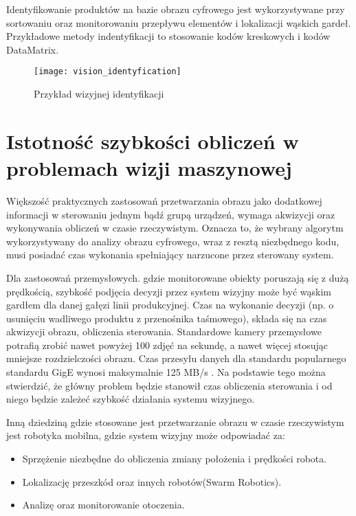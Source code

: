 \documentclass[document.tex]{subfiles}
\begin{document}
	\indent Identyfikowanie produktów na bazie obrazu cyfrowego jest wykorzystywane przy sortowaniu
	oraz monitorowaniu przepływu elementów i lokalizacji wąskich gardeł.
	Przykładowe metody indentyfikacji to stosowanie kodów kreskowych i kodów DataMatrix.\cite{Machine_Vision_Intro}

	\begin{figure}[h]
	\texttt{[image: vision\_identyfication]}
	\caption{Przykład wizyjnej identyfikacji\protect\cite{Machine_Vision_Intro}}
	\label{fig:identyfikacja}
	\end{figure}

\section{Istotność szybkości obliczeń w problemach wizji maszynowej}
\indent Większość praktycznych zastosowań przetwarzania obrazu jako dodatkowej 
informacji w sterowaniu jednym bądź grupą urządzeń, wymaga akwizycji oraz wykonywania
obliczeń w czasie rzeczywistym. Oznacza to, że wybrany algorytm wykorzystywany do 
analizy obrazu cyfrowego, wraz z resztą niezbędnego kodu, musi posiadać czas wykonania 
spełniający narzucone przez sterowany system.

\indent Dla zastosowań przemysłowych. gdzie monitorowane obiekty poruszają się z dużą prędkością, szybkość podjęcia decyzji przez system wizyjny
może być wąskim gardłem dla danej gałęzi linii produkcyjnej. Czas na wykonanie decyzji
(np. o usunięciu wadliwego produktu z przenośnika taśmowego), składa się na czas akwizycji obrazu,
obliczenia sterowania. Standardowe kamery przemysłowe potrafią zrobić nawet powyżej 100 zdjęć na sekundę, a nawet więcej stosując mniejsze rozdzielczości obrazu. Czas przesyłu danych dla
standardu popularnego standardu GigE wynosi maksymalnie 125 MB/s \cite{NI_camera_buses}. Na podstawie tego można stwierdzić, że główny problem będzie stanowił czas obliczenia sterowania i od niego będzie zależeć szybkość działania systemu wizyjnego\cite{Cognex_industrial_cameras}\cite{Basler_industrial_cameras}.

\indent Inną dziedziną gdzie stosowane jest przetwarzanie obrazu w czasie rzeczywistym
jest robotyka mobilna, gdzie system wizyjny może odpowiadać za:
\begin{itemize}
	\item Sprzężenie niezbędne do obliczenia zmiany położenia i prędkości robota.
	\item Lokalizację przeszkód oraz innych robotów(Swarm Robotics).
	\item Analizę oraz monitorowanie otoczenia.
\end{itemize}
\cite{Mazurek_Robot_Viterbi}\cite{Mobile_Robot_Dumbare}
\end{document}
